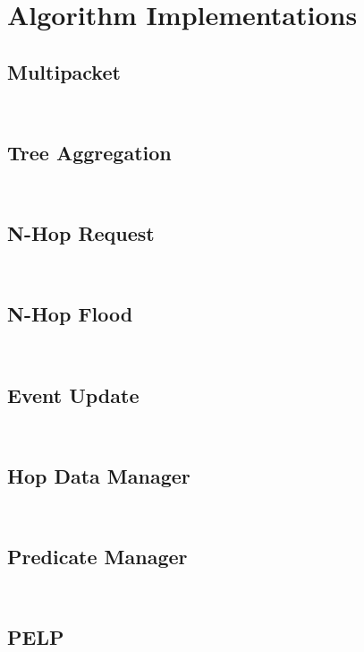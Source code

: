 \documentclass[a4paper,notitlepage]{article}
\newcommand{\sourcecode}[3]{%
\inputminted[linenos=true,tabsize=4,fontsize=\small,frame=lines,framesep=2mm]{c}{#1/#2}
\inputminted[linenos=true,tabsize=4,fontsize=\small,frame=lines,framesep=2mm]{c}{#1/#3}
}
\begin{document}
\appendixpage
\addappheadtotoc
\appendix



\newpage

\section{Algorithm Implementations}

\subsection{Multipacket}
\sourcecode{../Algorithms/Common/net}{multipacket.h}{multipacket.c}

\subsection{Tree Aggregation}
\sourcecode{../Algorithms/Common/net}{tree-aggregator.h}{tree-aggregator.c}

\subsection{N-Hop Request}
\sourcecode{../Algorithms/Common/net}{nhopreq.h}{nhopreq.c}

\subsection{N-Hop Flood}
\sourcecode{../Algorithms/Common/net}{nhopflood.h}{nhopflood.c}

\subsection{Event Update}
\sourcecode{../Algorithms/Common/net}{eventupdate.h}{eventupdate.c}

\subsection{Hop Data Manager}
\sourcecode{../Algorithms/PredEval}{hop-data-manager.h}{hop-data-manager.c}

\subsection{Predicate Manager}
\sourcecode{../Algorithms/PredEval}{predicate-manager.h}{predicate-manager.c}

\subsection{PELP}
\sourcecode{../Algorithms/PredEvalLocalPeriodic}{pelp.h}{pelp.c}
\end{document}
